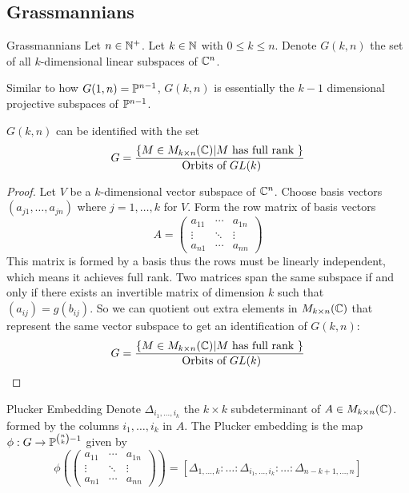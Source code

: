 \documentclass[a4paper]{article}
\begin{document}
\subsection{Grassmannians}
\begin{defn}{Grassmannians}{} Let $n\in\mathbb{N}^+$. Let $k\in\mathbb{N}$ with $0\leq k\leq n$. Denote $G(k,n)$ the set of all $k$-dimensional linear subspaces of $\mathbb{C}^n$. 
\end{defn}

Similar to how $G(1,n)=\mathbb{P}^{n-1}$, $G(k,n)$ is essentially the $k-1$ dimensional projective subspaces of $\mathbb{P}^{n-1}$. 

\begin{lmm}{}{} $G(k,n)$ can be identified with the set $$G=\frac{\{M\in M_{k\times n}(\mathbb{C})|M\text{ has full rank }\}}{\text{ Orbits of }GL(k)}$$ \tcbline
\begin{proof}
Let $V$ be a $k$-dimensional vector subspace of $\mathbb{C}^n$. Choose basis vectors $(a_{j1},\dots,a_{jn})$ where $j=1,\dots,k$ for $V$. Form the row matrix of basis vectors $$A=\begin{pmatrix}a_{11} & \cdots & a_{1n}\\\vdots & \ddots & \vdots\\ a_{n1} & \cdots & a_{nn}\end{pmatrix}$$
This matrix is formed by a basis thus the rows must be linearly independent, which means it achieves full rank. Two matrices span the same subspace if and only if there exists an invertible matrix of dimension $k$ such that $(a_{ij})=g(b_{ij})$. So we can quotient out extra elements in $M_{k\times n}(\mathbb{C})$ that represent the same vector subspace to get an identification of $G(k,n)$: $$G=\frac{\{M\in M_{k\times n}(\mathbb{C})|M\text{ has full rank }\}}{\text{ Orbits of }GL(k)}$$ 
\end{proof}
\end{lmm}

\begin{defn}{Plucker Embedding}{} Denote $\Delta_{i_1,\dots,i_k}$ the $k\times k$ subdeterminant of $A\in M_{k\times n}(\mathbb{C})$. formed by the columns $i_1,\dots,i_k$ in $A$. The Plucker embedding is the map $\phi:G\to\mathbb{P}^{\binom{n}{k}-1}$ given by $$\phi\left(\begin{pmatrix}a_{11} & \cdots & a_{1n}\\\vdots & \ddots & \vdots\\ a_{n1} & \cdots & a_{nn}\end{pmatrix}\right)=[\Delta_{1,\dots,k}:\dots:\Delta_{i_1,\dots,i_k}:\dots:\Delta_{n-k+1,\dots,n}]$$ 
\end{defn}
\end{document}
